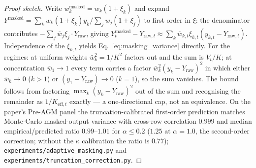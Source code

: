 \documentclass[pdflatex,sn-mathphys-num]{sn-jnl}
\theoremstyle{thmstyleone}
\theoremstyle{thmstyletwo}
\theoremstyle{thmstylethree}
\begin{document}
\begin{proof}[Proof sketch]
Write $w_k^{\text{masked}} = w_k(1+\xi_k)$ and expand $Y^{\text{masked}} = \sum_k w_k(1+\xi_k)y_k / \sum_j w_j(1+\xi_j)$ to first order in $\xi$: the denominator contributes $-\sum_j \bar{w}_j \xi_j \cdot Y_{\mathrm{raw}}$, giving $Y^{\text{masked}}_t - Y_{\mathrm{raw},t} \approx \sum_k \bar{w}_{k,t}\xi_{k,t}(y_{k,t} - Y_{\mathrm{raw},t})$. Independence of the $\xi_{k,t}$ yields Eq.~\eqref{eq:masking_variance} directly. For the regimes: at uniform weights $\bar{w}_k^2 = 1/K^2$ factors out and the sum is $V_t/K$; at concentration $\bar{w}_1 \to 1$ every term carries a factor $\bar{w}_k^2 (y_k - Y_{\mathrm{raw}})^2$ in which either $\bar{w}_k \to 0$ ($k > 1$) or $(y_1 - Y_{\mathrm{raw}}) \to 0$ ($k = 1$), so the sum vanishes. The bound follows from factoring $\max_k (y_k - Y_{\mathrm{raw}})^2$ out of the sum and recognising the remainder as $1/K_{\mathrm{eff},t}$ exactly --- a one-directional cap, not an equivalence. On the paper's Pre-AGM panel the truncation-calibrated first-order prediction matches Monte-Carlo masked-output variance with cross-row correlation $0.999$ and median empirical/predicted ratio $0.99$--$1.01$ for $\alpha \le 0.2$ ($1.25$ at $\alpha = 1.0$, the second-order correction; without the $\kappa$ calibration the ratio is $0.77$); \texttt{experiments/adaptive\_masking.py} and \texttt{experiments/truncation\_correction.py}.
\end{proof}
\end{document}
